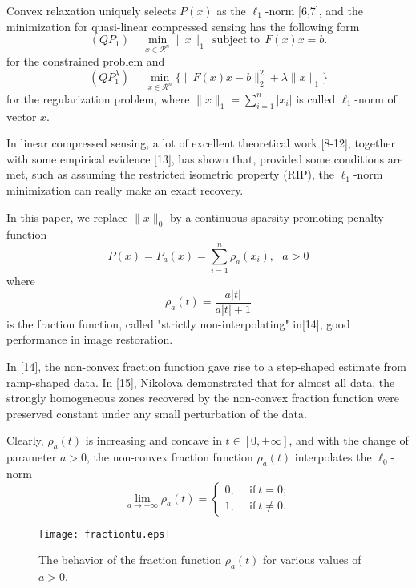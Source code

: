 \documentclass[smallextended]{svjour3}
\begin{document}
Convex relaxation uniquely selects $P(x)$ as the $\ell_{1}$-norm [6,7], and the minimization for quasi-linear compressed sensing has the
following form
\begin{equation}\label{r9}
(QP_{1})\ \ \ \ \ \min_{x\in \mathcal{R}^{n}}\|x\|_{1}\ \ \mathrm{subject}\ \mathrm{to}\ \ F(x)x=b.
\end{equation}
for the constrained problem and
\begin{equation}\label{r10}
(QP_{1}^{\lambda})\ \ \ \ \ \ \min_{x\in \mathcal{R}^{n}} \Big\{\|F(x)x-b\|_{2}^{2}+\lambda\|x\|_{1}\Big\}
\end{equation}
for the regularization problem, where $\|x\|_{1}=\sum_{i=1}^{n}|x_{i}|$ is called $\ell_{1}$-norm of vector $x$.

In linear compressed sensing, a lot of excellent theoretical work [8-12], together with some empirical
evidence [13], has shown that, provided some conditions are met, such as assuming the restricted isometric
property (RIP), the $\ell_{1}$-norm minimization can really make an exact recovery.

In this paper, we replace $\|x\|_{0}$ by a continuous sparsity promoting penalty function
\begin{equation}\label{r11}
P(x)=P_{a}(x)=\sum_{i=1}^{n}\rho_{a}(x_{i}),\ \ \ a>0
\end{equation}
where
\begin{equation}\label{r12}
\rho_{a}(t)=\frac{a|t|}{a|t|+1}
\end{equation}
is the fraction function, called "strictly non-interpolating" in[14], good performance in image restoration.

In [14], the non-convex fraction function gave rise to a step-shaped estimate from ramp-shaped data. In [15], Nikolova demonstrated
that for almost all data, the strongly homogeneous zones recovered by the non-convex fraction function were preserved constant under
any small perturbation of the data.

Clearly, $\rho_{a}(t)$ is increasing and concave in $t\in[0,+\infty]$, and with the change of parameter $a>0$,
the non-convex fraction function $\rho_{a}(t)$ interpolates the $\ell_{0}$-norm
\begin{equation}\label{r13}
\lim_{a\rightarrow+\infty}\rho_{a}(t)=\left\{
    \begin{array}{ll}
      0, & {\ \ \mathrm{if} \ t=0;} \\
      1, & {\ \ \mathrm{if} \ t\neq 0.}
    \end{array}
  \right.
\end{equation}
\begin{figure}[h!]
 \centering
 \texttt{[image: fractiontu.eps]}
\caption{The behavior of the fraction function $\rho_{a}(t)$ for various values of $a>0$.}
\label{fig:1}       
\end{figure}
\end{document}
